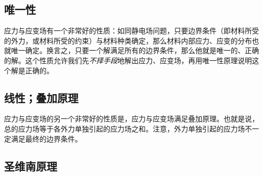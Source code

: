 
\begin{issues}
\issueDraft
\end{issues}

\subsection{唯一性}
应力与应变场有一个非常好的性质：如同静电场问题，只要边界条件（即材料所受的外力，或材料所受的约束）与材料种类确定，那么材料内部应力、应变的分布也就唯一确定。换言之，只要一个解满足所有的边界条件，那么他就是唯一的、正确的解。这个性质允许我们先\textsl{不择手段}地解出应力、应变场，再用唯一性原理说明这个解是正确的。

\subsection{线性；叠加原理}
应力与应变场的另一个非常好的性质是，应力与应变场满足叠加原理。也就是说，总的应力场等于各外力单独引起的应力场之和。注意，外力单独引起的应力场不一定满足最终的边界条件。

\subsection{圣维南原理}
